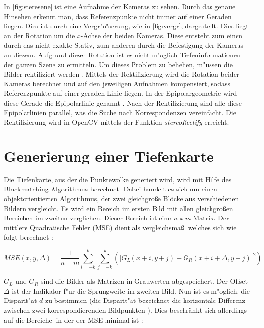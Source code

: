 \noindent In \ref{fig:steresene} ist eine Aufnahme der Kameras zu sehen. Durch das genaue Hinsehen erkennt man, dass Referenzpunkte nicht immer auf einer Geraden liegen. Dies ist durch eine Vergr"o"serung, wie in \ref{fig:vergr}, dargestellt. Dies liegt an der Rotation um die $x$-Achse der beiden Kameras. Diese entsteht zum einen durch das nicht exakte Stativ, zum anderen durch die Befestigung der Kameras an diesem. Aufgrund dieser Rotation ist es nicht m"oglich Tiefeninformationen der ganzen Szene zu ermitteln. Um dieses Problem zu beheben, m"ussen die Bilder rektifiziert werden \cite{zbs}. Mittels der Rektifizierung wird die Rotation beider Kameras berechnet und auf den jeweiligen Aufnahmen kompensiert, sodass Referenzpunkte auf einer geraden Linie liegen. In der Epipolargeometrie wird diese Gerade die Epipolarlinie genannt \cite{ocvs} \cite{wepi}. Nach der Rektifizierung sind alle diese Epipolarlinien parallel, was die Suche nach Korrespondenzen vereinfacht. Die Rektifizierung wird in OpenCV mittels der Funktion \textit{stereoRectify} erreicht.

\section{Generierung einer Tiefenkarte} 
\label{sec:gernerierungdep}

Die Tiefenkarte, aus der die Punktewolke generiert wird, wird mit Hilfe des Blockmatching Algorithmus berechnet. Dabei handelt es sich um einen objektorientierten Algorithmus, der zwei gleichgroße Blöcke aus verschiedenen Bildern vergleicht. Es wird ein Bereich im ersten Bild mit allen gleichgroßen Bereichen im zweiten verglichen. Dieser Bereich ist eine \textit{n x m}-Matrix. Der mittlere Quadratische Fehler (MSE) dient als vergleichsmaß, welches sich wie folgt berechnet \cite{HAW}:

\begin{equation}
MSE(x,y,\Delta) = \dfrac{1}{n-m} \sum_{i=-k}^k \sum_{j=-k}^k (|G_{L}(x+i, y+j) - G_{R}(x+i+\Delta, y+j)|^2)
\end{equation}

\noindent $G_{L}$ und $G_{R}$ sind die Bilder als Matrizen in Grauwerten abgespeichert. Der Offset $\Delta$ ist der Indikator f"ur die Sprungweite im zweiten Bild. Nun ist es m"oglich, die Disparit"at $d$ zu bestimmen (die Disparit"at bezeichnet die horizontale Differenz zwischen zwei korrespondierenden Bildpunkten \cite{disp}). Dies beschränkt sich allerdings auf die Bereiche, in der der MSE minimal ist \cite{HAW}:

